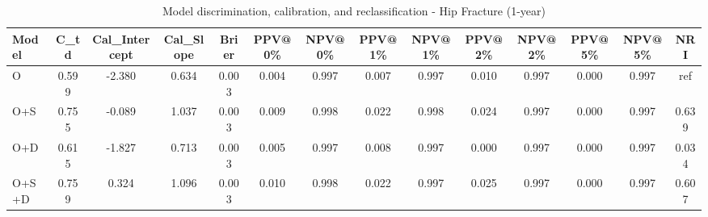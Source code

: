 \begin{table}[htbp]
\centering
\small
\caption{Model discrimination, calibration, and reclassification - Hip Fracture (1-year)}
\label{tab:perf_pd_1y}
\begin{tabular}{lccccccccccccc}
\toprule
Model & C\_td & Cal\_Intercept & Cal\_Slope & Brier & PPV@0\% & NPV@0\% & PPV@1\% & NPV@1\% & PPV@2\% & NPV@2\% & PPV@5\% & NPV@5\% & NRI \\
\midrule
O & 0.599 & -2.380 & 0.634 & 0.003 & 0.004 & 0.997 & 0.007 & 0.997 & 0.010 & 0.997 & 0.000 & 0.997 & ref \\
O+S & 0.755 & -0.089 & 1.037 & 0.003 & 0.009 & 0.998 & 0.022 & 0.998 & 0.024 & 0.997 & 0.000 & 0.997 & 0.639 \\
O+D & 0.615 & -1.827 & 0.713 & 0.003 & 0.005 & 0.997 & 0.008 & 0.997 & 0.000 & 0.997 & 0.000 & 0.997 & 0.034 \\
O+S+D & 0.759 & 0.324 & 1.096 & 0.003 & 0.010 & 0.998 & 0.022 & 0.997 & 0.025 & 0.997 & 0.000 & 0.997 & 0.607 \\
\bottomrule
\end{tabular}
\end{table}
